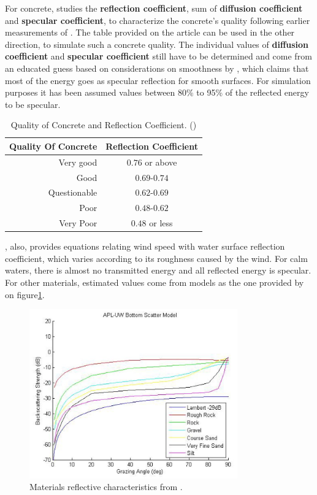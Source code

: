 For concrete, \citet{chirp} studies the \textbf{reflection coefficient}, sum of
\textbf{diffusion coefficient} and \textbf{specular coefficient}, to
characterize the concrete's quality following earlier measurements of
\citet{leslie1949ultrasonic}. The table provided on the article can be used in
the other direction, to simulate such a concrete quality. The individual values of \textbf{diffusion coefficient} and \textbf{specular coefficient} still
have to be determined and come from an educated guess based on considerations on
smoothness by \citet{Etter2013}, which claims that most of the energy goes as
specular reflection for smooth surfaces. For
simulation purposes it has been assumed values between 80\% to 95\% of the
reflected energy to be specular.

\begin{table}[hbt]
\centering
\begin{tabular}{rc}
Quality Of Concrete & Reflection Coefficient \\
\hline
Very good & $0.76$ or above  \\
Good & $0.69$-$0.74$  \\
Questionable & $0.62$-$0.69$  \\
Poor & $0.48$-$0.62$  \\
Very Poor & $0.48$ or less  \\
\end{tabular}
\caption{Quality of Concrete and Reflection Coefficient.
(\citet{chirp,leslie1949ultrasonic})}
\end{table}

\citet{Etter2013}, also, provides equations relating wind speed with water
surface reflection coefficient, which varies according to its roughness caused
by the wind. For calm waters, there is almost no transmitted energy and all
reflected energy is specular. For other materials, estimated values come from
models as the one provided by \citet{miller2015real} on
figure\ref{fig:materials}.

\begin{figure}[h]
	\centering
	\includegraphics[width=0.8\textwidth]{Chap2/fig/materials}
	\caption{Materials reflective characteristics from \citet{miller2015real}.}
	\label{fig:materials}
\end{figure}
